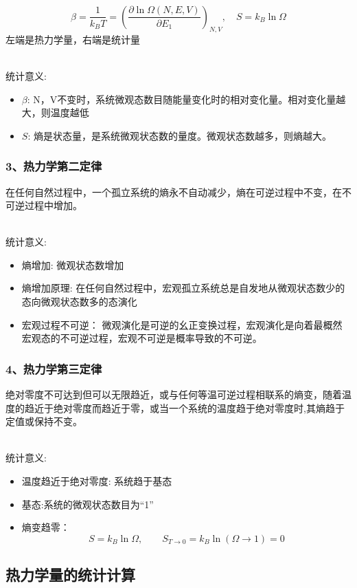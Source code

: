 \begin{frame}
  \frametitle{}
  \[ \boxed{\beta = \frac{1}{ k_B T} = \left(\frac{\partial \ln \Omega (N,E,V) }{\partial E_1 }\right)_{N,V}, \quad S = k_B \ln \Omega }\]
  左端是热力学量，右端是统计量 

  ~~\\ 
  统计意义:
  \begin{itemize}
    \item $\beta $: N，V不变时，系统微观态数目随能量变化时的相对变化量。相对变化量越大，则温度越低
    \item $S$: 熵是状态量，是系统微观状态数的量度。微观状态数越多，则熵越大。 
  \end{itemize}
\end{frame} 

\begin{frame}
  \frametitle{ 3、热力学第二定律}
 \emf[熵增加原理：] 在任何自然过程中，一个孤立系统的熵永不自动减少，熵在可逆过程中不变，在不可逆过程中增加。

 ~~\\ 
 统计意义:
  \begin{itemize}
    \item 熵增加: 微观状态数增加
    \item 熵增加原理: 在任何自然过程中，宏观孤立系统总是自发地从微观状态数少的态向微观状态数多的态演化
    \item 宏观过程不可逆： 微观演化是可逆的幺正变换过程，宏观演化是向着最概然宏观态的不可逆过程，宏观不可逆是概率导致的不可逆。
  \end{itemize}
\end{frame} 

\begin{frame}
  \frametitle{ 4、热力学第三定律}
  \emf[表述：]绝对零度不可达到但可以无限趋近，或与任何等温可逆过程相联系的熵变，随着温度的趋近于绝对零度而趋近于零，或当一个系统的温度趋于绝对零度时,其熵趋于定值或保持不变。

 ~~\\ 
 统计意义:
  \begin{itemize}
    \item 温度趋近于绝对零度: 系统趋于基态
    \item 基态:系统的微观状态数目为“1”
    \item 熵变趋零：
\[ S = k_B \ln \Omega, \qquad S_{T \to 0} = k_B \ln (\Omega \to 1) = 0 \]
  \end{itemize}
\end{frame} 

\subsection{热力学量的统计计算}

